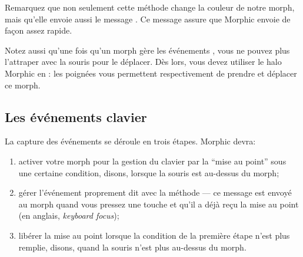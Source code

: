 \documentclass[a4paper,10pt,twoside]{book}
\begin{document}
Remarquez que non seulement cette méthode change la couleur de notre
morph, mais qu'elle envoie aussi le message .
Ce message assure que Morphic envoie 
de façon assez rapide.


Notez aussi qu'une fois qu'un morph gère les événements , vous ne pouvez plus l'attraper avec la souris pour le déplacer.
Dès lors, vous devez utiliser le halo Morphic en \arelire{\metaclickant}: les poignées 
vous permettent respectivement de prendre et déplacer ce morph.



\subsection{Les événements clavier}

La capture des événements  se déroule en trois
étapes. Morphic devra:


\begin{enumerate}
	\item activer votre morph pour la gestion du clavier par la ``mise
      au point'' sous une certaine condition, disons, lorsque la souris est au-dessus du morph; 
	\item gérer l'événement proprement dit avec la méthode
       --- ce message est envoyé au
      morph quand vous pressez une touche et qu'il a déjà reçu
      la mise au point  (en anglais, \emph{keyboard focus});
	\item libérer la mise au point lorsque la condition de la
      première étape n'est plus remplie, disons, quand la souris
      n'est plus au-dessus du morph.
\end{enumerate}
\end{document}
